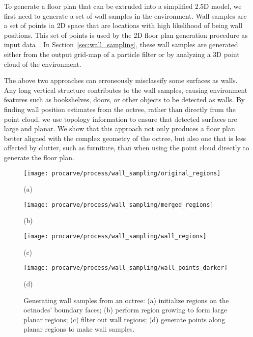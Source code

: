 \documentclass[12pt,onecolumn,oneside]{book}
\begin{document}
To generate a floor plan that can be extruded into a simplified 2.5D model, we first need to generate a set of wall samples in the environment.  Wall samples are a set of points in 2D space that are locations with high likelihood of being wall positions.  This set of points is used by the 2D floor plan generation procedure as input data~\cite{Turner14}.  In Section~\ref{sec:wall_sampling}, these wall samples are generated either from the output grid-map of a particle filter or by analyzing a 3D point cloud of the environment.

The above two approaches can erroneously misclassify some surfaces as walls.  Any long vertical structure contributes to the wall samples, causing environment features such as bookshelves, doors, or other objects to be detected as walls.  By finding wall position estimates from the octree, rather than directly from the point cloud, we use topology information to ensure that detected surfaces are large and planar.  We show that this approach not only produces a floor plan better aligned with the complex geometry of the octree, but also one that is less affected by clutter, such as furniture, than when using the point cloud directly to generate the floor plan.

\begin{figure}[t]
	\begin{minipage}[t]{0.49\linewidth}
		\centerline{\texttt{[image: procarve/process/wall\_sampling/original\_regions]}}
		\centerline{(a)}
	\end{minipage}
	\hfill
	\begin{minipage}[t]{0.49\linewidth}
		\centerline{\texttt{[image: procarve/process/wall\_sampling/merged\_regions]}}
		\centerline{(b)}
	\end{minipage}
	

	\begin{minipage}[t]{0.49\linewidth}
		\centerline{\texttt{[image: procarve/process/wall\_sampling/wall\_regions]}}
		\centerline{(c)}
	\end{minipage}
	\hfill
	\begin{minipage}[t]{0.49\linewidth}
		\centerline{\texttt{[image: procarve/process/wall\_sampling/wall\_points\_darker]}}
		\centerline{(d)}
	\end{minipage}

	\caption[Generating wall samples from an octree.]{Generating wall samples from an octree: (a) initialize regions on the octnodes' boundary faces; (b) perform region growing to form large planar regions; (c) filter out wall regions; (d) generate points along planar regions to make wall samples.}
	\label{fig:oct2dq}
\end{figure}
\end{document}
